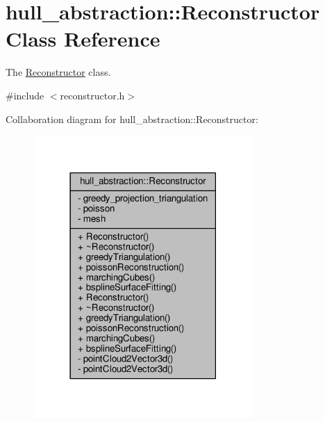 \hypertarget{classhull__abstraction_1_1_reconstructor}{}\section{hull\+\_\+abstraction\+:\+:Reconstructor Class Reference}
\label{classhull__abstraction_1_1_reconstructor}


The \hyperlink{classhull__abstraction_1_1_reconstructor}{Reconstructor} class.  




{\ttfamily \#include $<$reconstructor.\+h$>$}



Collaboration diagram for hull\+\_\+abstraction\+:\+:Reconstructor\+:\nopagebreak
\begin{figure}[H]
\begin{center}
\leavevmode
\includegraphics[width=237pt]{classhull__abstraction_1_1_reconstructor__coll__graph}
\end{center}
\end{figure}
